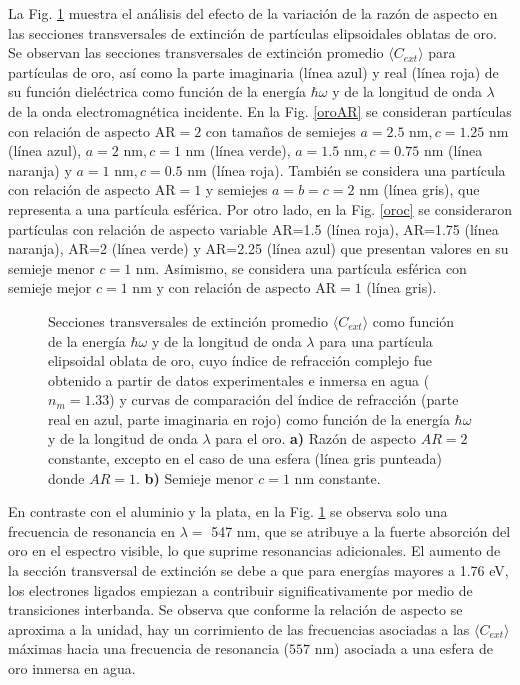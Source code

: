 La Fig. \ref{oro} muestra el análisis del efecto de la variación de la razón de aspecto en las secciones transversales de extinción de partículas elipsoidales oblatas de oro. Se observan las secciones transversales de extinción promedio  $\langle C_{ext}\rangle$ para partículas de oro, así como la parte imaginaria (línea azul) y real (línea roja) de su función dieléctrica como función de la energía $\hbar\omega$ y de la longitud de onda $\lambda$ de la onda electromagnética incidente. En la Fig. \ref{oroAR} se consideran partículas con relación de aspecto AR$=2$ con tamaños de semiejes $a=2.5 \text{ nm}, c=1.25 \text{ nm}$ (línea azul), $a=2 \text{ nm}, c=1 \text{ nm}$ (línea verde), $a=1.5 \text{ nm}, c=0.75 \text{ nm}$ (línea naranja) y $a=1 \text{ nm}, c=0.5 \text{ nm}$ (línea roja). También se considera una partícula con relación de aspecto AR$=1$ y semiejes $a=b=c=2$ nm (línea gris), que representa a una partícula esférica. Por otro lado, en la Fig. \ref{oroc} se consideraron partículas con relación de aspecto variable AR=1.5 (línea roja), AR=1.75 (línea naranja), AR=2 (línea verde) y AR=2.25 (línea azul) que presentan valores en su semieje menor $c=1\text{ nm}$. Asimismo, se considera una partícula esférica con semieje mejor $c=1\text{ nm}$ y con relación de aspecto AR$=1$ (línea gris).
\begin{figure}[H]
	\quad%
	\caption{Secciones transversales de extinción promedio $\langle C_{ext}\rangle$ como función de la energía $\hbar\omega$ y de la longitud de onda $\lambda$ para una partícula elipsoidal oblata de oro, cuyo índice de refracción complejo fue obtenido a partir de datos experimentales  e inmersa en agua ($n_m=1.33$) y curvas de comparación del índice de refracción (parte real en azul, parte imaginaria en rojo) como función de la energía $\hbar\omega$ y de la longitud de onda $\lambda$ para el oro. \textbf{a)} Razón de aspecto $AR=2$ constante, excepto en el caso de una esfera (línea gris punteada) donde $AR=1$. \textbf{b)} Semieje menor $c=1$ nm constante.}\label{oro}
\end{figure}

En contraste con el aluminio y la plata, en la Fig. \ref{oro} se observa solo una frecuencia de resonancia en $\lambda=$ 547 nm, que se atribuye a la fuerte absorción del oro en el espectro visible, lo que suprime resonancias adicionales. El aumento de la sección transversal de extinción se debe a que para energías mayores a 1.76 eV, los electrones ligados empiezan a contribuir significativamente por medio de transiciones interbanda. Se observa que conforme la relación de aspecto se aproxima a la unidad, hay un corrimiento de las frecuencias asociadas a las $\langle C_{ext}\rangle$ máximas hacia una frecuencia de resonancia ($557\text{ nm}$) asociada a una esfera de oro inmersa en agua. 



